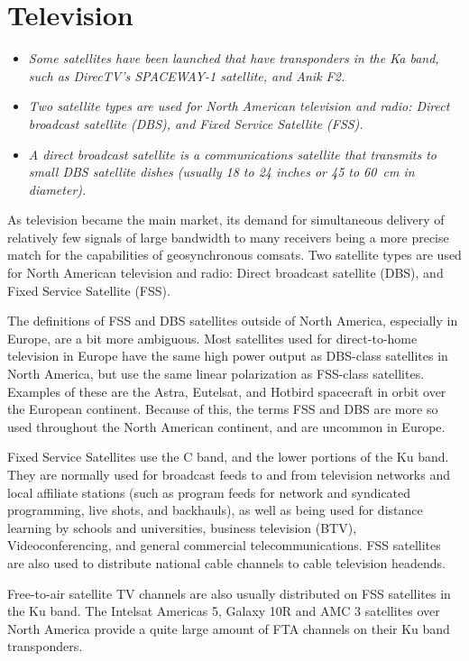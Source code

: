 \section{Television}\label{television}

\begin{itemize}
\item
  \emph{Some satellites have been launched that have transponders in the
  Ka band, such as DirecTV's SPACEWAY-1 satellite, and Anik F2.}
\item
  \emph{Two satellite types are used for North American television and
  radio: Direct broadcast satellite (DBS), and Fixed Service Satellite
  (FSS).}
\item
  \emph{A direct broadcast satellite is a communications satellite that
  transmits to small DBS satellite dishes (usually 18 to 24 inches or 45
  to 60~cm in diameter).}
\end{itemize}

As television became the main market, its demand for simultaneous
delivery of relatively few signals of large bandwidth to many receivers
being a more precise match for the capabilities of geosynchronous
comsats. Two satellite types are used for North American television and
radio: Direct broadcast satellite (DBS), and Fixed Service Satellite
(FSS).

The definitions of FSS and DBS satellites outside of North America,
especially in Europe, are a bit more ambiguous. Most satellites used for
direct-to-home television in Europe have the same high power output as
DBS-class satellites in North America, but use the same linear
polarization as FSS-class satellites. Examples of these are the Astra,
Eutelsat, and Hotbird spacecraft in orbit over the European continent.
Because of this, the terms FSS and DBS are more so used throughout the
North American continent, and are uncommon in Europe.

Fixed Service Satellites use the C band, and the lower portions of the
Ku band. They are normally used for broadcast feeds to and from
television networks and local affiliate stations (such as program feeds
for network and syndicated programming, live shots, and backhauls), as
well as being used for distance learning by schools and universities,
business television (BTV), Videoconferencing, and general commercial
telecommunications. FSS satellites are also used to distribute national
cable channels to cable television headends.

Free-to-air satellite TV channels are also usually distributed on FSS
satellites in the Ku band. The Intelsat Americas 5, Galaxy 10R and AMC 3
satellites over North America provide a quite large amount of FTA
channels on their Ku band transponders.

